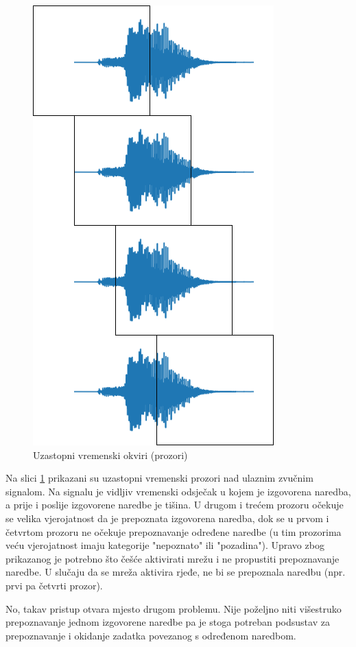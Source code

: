 \begin{figure}[htb]
    \centering
    \includegraphics[width=0.4\linewidth]{Chapters/struktura_sustava/aktivacija_nn/timeline.png}
    \caption{Uzastopni vremenski okviri (prozori) \cite{flowchart}}
    \label{pic:timeline}
\end{figure}

Na slici \ref{pic:timeline} prikazani su uzastopni vremenski prozori nad ulaznim zvučnim signalom.
Na signalu je vidljiv vremenski odsječak u kojem je izgovorena naredba, a prije i poslije
izgovorene naredbe je tišina. U drugom i trećem prozoru očekuje se velika vjerojatnost da 
je prepoznata izgovorena naredba, dok se u prvom i četvrtom prozoru ne očekuje prepoznavanje
određene naredbe (u tim prozorima veću vjerojatnost imaju kategorije "nepoznato" ili "pozadina").
Upravo zbog prikazanog je potrebno što češće aktivirati mrežu i ne propustiti prepoznavanje naredbe. 
U slučaju da se mreža aktivira rjeđe, ne bi se prepoznala naredbu (npr. prvi pa četvrti
prozor). 

No, takav pristup otvara mjesto drugom problemu. Nije poželjno niti višestruko prepoznavanje
jednom izgovorene naredbe pa je stoga potreban podsustav za prepoznavanje i okidanje zadatka
povezanog s određenom naredbom.